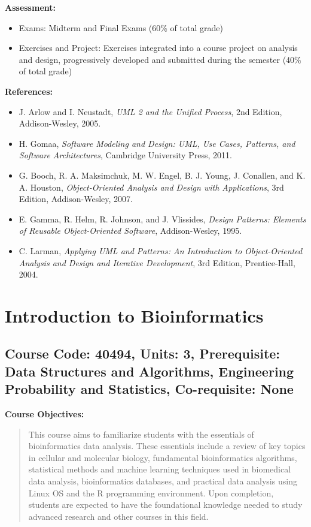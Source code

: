 \documentclass[12pt]{article}
\begin{document}
\textbf{Assessment:}
\begin{itemize}
    \item Exams: Midterm and Final Exams (60\% of total grade)
    \item Exercises and Project: Exercises integrated into a course project on analysis and design, progressively developed and submitted during the semester (40\% of total grade)
\end{itemize}

\textbf{References:}
\begin{itemize}
    \item J. Arlow and I. Neustadt, \textit{UML 2 and the Unified Process}, 2nd Edition, Addison-Wesley, 2005.
    \item H. Gomaa, \textit{Software Modeling and Design: UML, Use Cases, Patterns, and Software Architectures}, Cambridge University Press, 2011.
    \item G. Booch, R. A. Maksimchuk, M. W. Engel, B. J. Young, J. Conallen, and K. A. Houston, \textit{Object-Oriented Analysis and Design with Applications}, 3rd Edition, Addison-Wesley, 2007.
    \item E. Gamma, R. Helm, R. Johnson, and J. Vlissides, \textit{Design Patterns: Elements of Reusable Object-Oriented Software}, Addison-Wesley, 1995.
    \item C. Larman, \textit{Applying UML and Patterns: An Introduction to Object-Oriented Analysis and Design and Iterative Development}, 3rd Edition, Prentice-Hall, 2004.
\end{itemize}

\newpage

\section{Introduction to Bioinformatics}
\subsection*{Course Code: 40494, Units: 3, Prerequisite: Data Structures and Algorithms, Engineering Probability and Statistics, Co-requisite: None}

\textbf{Course Objectives:} 
\begin{quote}
   This course aims to familiarize students with the essentials of bioinformatics data analysis. These essentials include a review of key topics in cellular and molecular biology, fundamental bioinformatics algorithms, statistical methods and machine learning techniques used in biomedical data analysis, bioinformatics databases, and practical data analysis using Linux OS and the R programming environment. Upon completion, students are expected to have the foundational knowledge needed to study advanced research and other courses in this field.
\end{quote}
\end{document}
